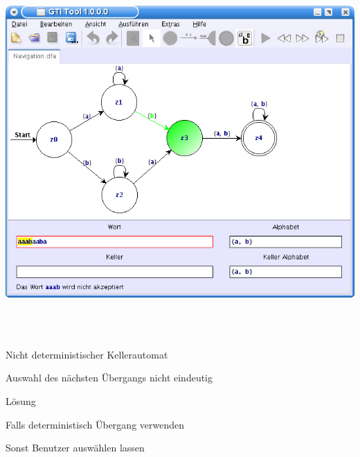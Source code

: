 {
  \begin{center}
    \includegraphics[height=14cm]{../images/dfa_navigation.png}
  \end{center}
}


{
    \begin{itemgroup}{}
	\item Nicht deterministischer Kellerautomat
	\item Auswahl des nächsten Übergangs nicht eindeutig
    \end{itemgroup}

    \begin{itemgroup}{Lösung}
	\item Falls deterministisch Übergang verwenden
	\item Sonst Benutzer auswählen lassen
	\end{itemgroup}
    
    \vfill{}
}


